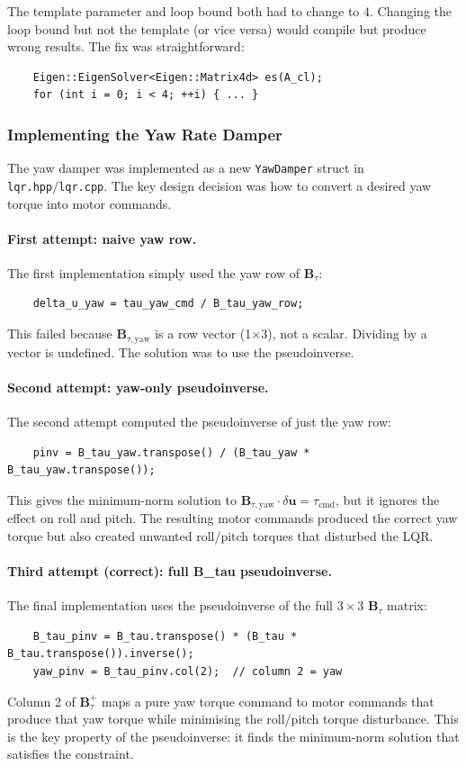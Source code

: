 \documentclass[12pt, a4paper]{article}
\newcommand{\bu}{\bm{u}}
\newcommand{\bB}{\bm{B}}
\begin{document}
The template parameter and loop bound both had to change to 4.  Changing the loop bound but not the template (or vice versa) would compile but produce wrong results.  The fix was straightforward:
\begin{verbatim}
    Eigen::EigenSolver<Eigen::Matrix4d> es(A_cl);
    for (int i = 0; i < 4; ++i) { ... }
\end{verbatim}

\subsubsection{Implementing the Yaw Rate Damper}

The yaw damper was implemented as a new \texttt{YawDamper} struct in \texttt{lqr.hpp}/\texttt{lqr.cpp}.  The key design decision was how to convert a desired yaw torque into motor commands.

\paragraph{First attempt: naive yaw row.}  The first implementation simply used the yaw row of $\bB_\tau$:
\begin{verbatim}
    delta_u_yaw = tau_yaw_cmd / B_tau_yaw_row;
\end{verbatim}
This failed because $\bB_{\tau,\text{yaw}}$ is a row vector (1$\times$3), not a scalar.  Dividing by a vector is undefined.  The solution was to use the pseudoinverse.

\paragraph{Second attempt: yaw-only pseudoinverse.}  The second attempt computed the pseudoinverse of just the yaw row:
\begin{verbatim}
    pinv = B_tau_yaw.transpose() / (B_tau_yaw * B_tau_yaw.transpose());
\end{verbatim}
This gives the minimum-norm solution to $\bB_{\tau,\text{yaw}} \cdot \delta\bu = \tau_{\text{cmd}}$, but it ignores the effect on roll and pitch.  The resulting motor commands produced the correct yaw torque but also created unwanted roll/pitch torques that disturbed the LQR.

\paragraph{Third attempt (correct): full B\_tau pseudoinverse.}  The final implementation uses the pseudoinverse of the full $3 \times 3$ $\bB_\tau$ matrix:
\begin{verbatim}
    B_tau_pinv = B_tau.transpose() * (B_tau * B_tau.transpose()).inverse();
    yaw_pinv = B_tau_pinv.col(2);  // column 2 = yaw
\end{verbatim}
Column 2 of $\bB_\tau^+$ maps a pure yaw torque command to motor commands that produce that yaw torque while minimising the roll/pitch torque disturbance.  This is the key property of the pseudoinverse: it finds the minimum-norm solution that satisfies the constraint.
\end{document}
